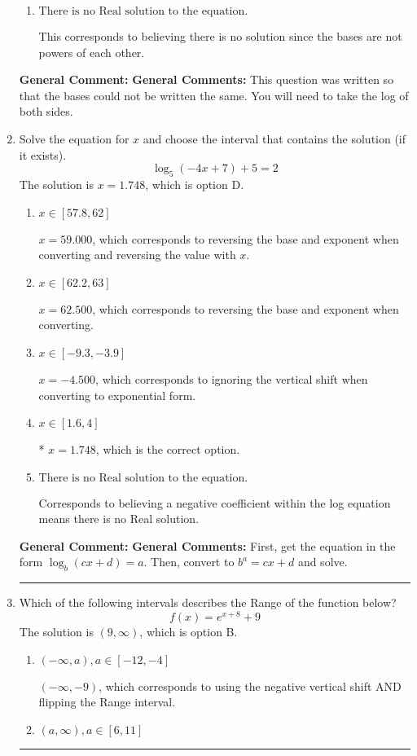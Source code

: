 \documentclass{extbook}[14pt]
\newcommand{\litem}[1]{\item #1

\rule{\textwidth}{0.4pt}}
\begin{document}
\begin{enumerate}
{\begin{enumerate}[label=\Alph*.]
$x = 1.000$, which corresponds to solving the numerators as equal while ignoring the bases are different.
\item \( \text{There is no Real solution to the equation.} \)

This corresponds to believing there is no solution since the bases are not powers of each other.
\end{enumerate}

\textbf{General Comment:} \textbf{General Comments:} This question was written so that the bases could not be written the same. You will need to take the log of both sides.
}
\litem{
Solve the equation for $x$ and choose the interval that contains the solution (if it exists).
\[ \log_{5}{(-4x+7)}+5 = 2 \]The solution is \( x = 1.748 \), which is option D.\begin{enumerate}[label=\Alph*.]
\item \( x \in [57.8, 62] \)

$x = 59.000$, which corresponds to reversing the base and exponent when converting and reversing the value with $x$.
\item \( x \in [62.2, 63] \)

$x = 62.500$, which corresponds to reversing the base and exponent when converting.
\item \( x \in [-9.3, -3.9] \)

$x = -4.500$, which corresponds to ignoring the vertical shift when converting to exponential form.
\item \( x \in [1.6, 4] \)

* $x = 1.748$, which is the correct option.
\item \( \text{There is no Real solution to the equation.} \)

Corresponds to believing a negative coefficient within the log equation means there is no Real solution.
\end{enumerate}

\textbf{General Comment:} \textbf{General Comments:} First, get the equation in the form $\log_b{(cx+d)} = a$. Then, convert to $b^a = cx+d$ and solve.
}
\litem{
Which of the following intervals describes the Range of the function below?
\[ f(x) = e^{x+8}+9 \]The solution is \( (9, \infty) \), which is option B.\begin{enumerate}[label=\Alph*.]
\item \( (-\infty, a), a \in [-12, -4] \)

$(-\infty, -9)$, which corresponds to using the negative vertical shift AND flipping the Range interval.
\item \( (a, \infty), a \in [6, 11] \)


\end{enumerate}}
\end{enumerate}
\end{document}
